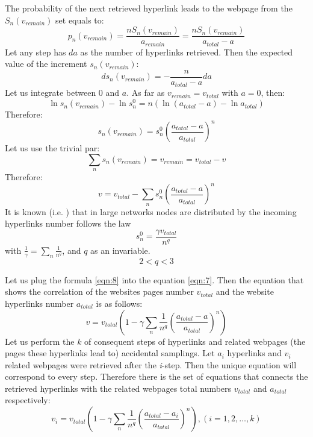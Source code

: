 The probability of the next retrieved hyperlink leads to the webpage from the \(S_n (v_{remain})\) set equals to:
\[
p_n(v_{remain}) = \frac{n S_n (v_{remain})}{a_{remain}} = \frac{n S_n (v_{remain})}{a_{total} - a}
\]
Let any step has \(da\) as the number of hyperlinks retrieved. Then the expected value of the increment \(s_n (v_{remain})\):
\[
ds_n (v_{remain}) = -\frac{n }{a_{total} - a} da
\]
Let us integrate between \(0\) and \(a\). As far as \(v_{remain} = v_{total}\) with \(a = 0\), then:
\[
\ln{s_n (v_{remain})} - \ln{s^0_n} = n(\ln{(a_{total} - a)} - \ln{a_{total}})
\]
Therefore:
\[
s_n(v_{remain}) = s^0_n (\frac{a_{total} - a}{a_{total}})^n
\]
Let us use the trivial par:
\[
\sum_{n} s_n (v_{remain}) = v_{remain} = v_{total} - v
\]
Therefore:
\begin{equation}
	\label{eqn:7}
	v = v_{total} - \sum_{n} s^0_n (\frac{a_{total} - a}{a_{total}})^n
\end{equation}
It is known (i.e. \cite{BarabasiAlbert,KumarRaghavanRajagopalan}) that in large networks nodes are distributed by the incoming hyperlinks number follows the law
\begin{equation}
	\label{eqn:8}
	s^0_n = \frac{\gamma v_{total}}{n^q}
\end{equation} with \(\frac{1}{\gamma} = \sum_{n} \frac{1}{n^q}\), and \(q\) as an invariable.
\begin{equation}
	\label{eqn:9}
	2 < q < 3
\end{equation}

Let us plug the formula \cref{eqn:8} into the equation \cref{eqn:7}. Then the equation that shows the correlation of the websites pages number \(v_{total}\) and the website hyperlinks number \(a_{total}\) is as follows:
\begin{equation}
	\label{eqn:10}
	v = v_{total}(1 - \gamma \sum_{n} \frac{1}{n^q} (\frac{a_{total} - a}{a_{total}})^n)
\end{equation}
Let us perform the \(k\) of consequent steps of hyperlinks and related webpages (the pages these hyperlinks lead to) accidental samplings. Let \(a_i\) hyperlinks and \(v_i\) related webpages were retrieved after the \textit{i}-step. Then the unique equation will correspond to every step. Therefore there is the set of equations that connects the retrieved hyperlinks with the related webpages total numbers \(v_{total}\) and \(a_{total}\) respectively:
\begin{equation}
	\label{eqn:11}
	v_i = v_{total}(1 - \gamma \sum_{n} \frac{1}{n^q}(\frac{a_{total} - a_i}{a_{total}})^n), (i = 1, 2, \ldots , k) 
\end{equation}

